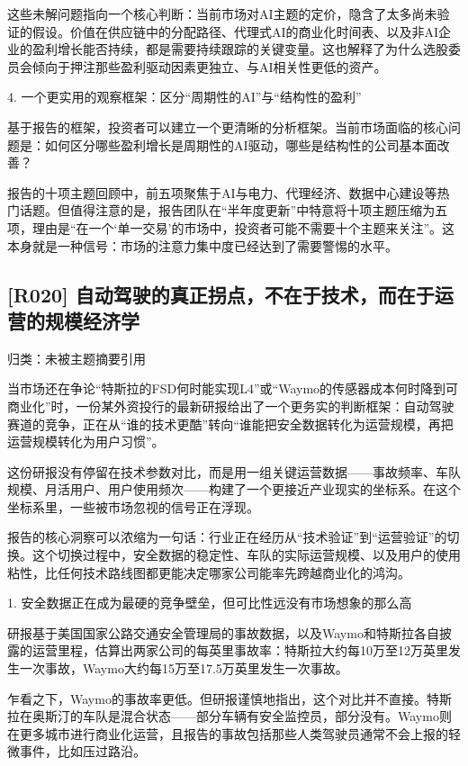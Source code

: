 \documentclass[11pt]{ctexart}
\begin{document}
这些未解问题指向一个核心判断：当前市场对AI主题的定价，隐含了太多尚未验证的假设。价值在供应链中的分配路径、代理式AI的商业化时间表、以及非AI企业的盈利增长能否持续，都是需要持续跟踪的关键变量。这也解释了为什么选股委员会倾向于押注那些盈利驱动因素更独立、与AI相关性更低的资产。

4. 一个更实用的观察框架：区分“周期性的AI”与“结构性的盈利”

基于报告的框架，投资者可以建立一个更清晰的分析框架。当前市场面临的核心问题是：如何区分哪些盈利增长是周期性的AI驱动，哪些是结构性的公司基本面改善？

报告的十项主题回顾中，前五项聚焦于AI与电力、代理经济、数据中心建设等热门话题。但值得注意的是，报告团队在“半年度更新”中特意将十项主题压缩为五项，理由是“在一个‘单一交易’的市场中，投资者可能不需要十个主题来关注”。这本身就是一种信号：市场的注意力集中度已经达到了需要警惕的水平。

\subsection{[R020] 自动驾驶的真正拐点，不在于技术，而在于运营的规模经济学}
{\small\color{refgray}归类：未被主题摘要引用}

当市场还在争论“特斯拉的FSD何时能实现L4”或“Waymo的传感器成本何时降到可商业化”时，一份某外资投行的最新研报给出了一个更务实的判断框架：自动驾驶赛道的竞争，正在从“谁的技术更酷”转向“谁能把安全数据转化为运营规模，再把运营规模转化为用户习惯”。

这份研报没有停留在技术参数对比，而是用一组关键运营数据——事故频率、车队规模、月活用户、用户使用频次——构建了一个更接近产业现实的坐标系。在这个坐标系里，一些被市场忽视的信号正在浮现。

报告的核心洞察可以浓缩为一句话：行业正在经历从“技术验证”到“运营验证”的切换。这个切换过程中，安全数据的稳定性、车队的实际运营规模、以及用户的使用粘性，比任何技术路线图都更能决定哪家公司能率先跨越商业化的鸿沟。

1. 安全数据正在成为最硬的竞争壁垒，但可比性远没有市场想象的那么高

研报基于美国国家公路交通安全管理局的事故数据，以及Waymo和特斯拉各自披露的运营里程，估算出两家公司的每英里事故率：特斯拉大约每10万至12万英里发生一次事故，Waymo大约每15万至17.5万英里发生一次事故。

乍看之下，Waymo的事故率更低。但研报谨慎地指出，这个对比并不直接。特斯拉在奥斯汀的车队是混合状态——部分车辆有安全监控员，部分没有。Waymo则在更多城市进行商业化运营，且报告的事故包括那些人类驾驶员通常不会上报的轻微事件，比如压过路沿。
\end{document}

